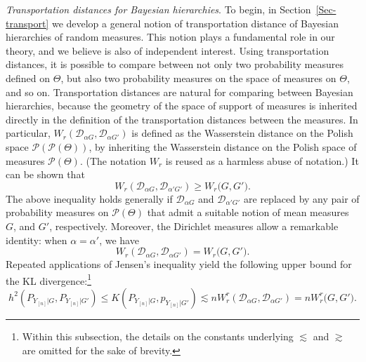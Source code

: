 \documentclass[MSNbibl,number,citesort]{arxbj}
\newcommand{\Pcal}{\mathscr{P}}
\newcommand{\DP}{\mathscr{D}}
\newcommand{\Wr}{W_r}
\newcommand{\PG}{P_{Y_{[n]}|G}}
\begin{document}
\textit{Transportation distances for Bayesian hierarchies}.
To begin, in Section~\ref{Sec-transport} we
develop a general notion of transportation distance of
Bayesian hierarchies of random measures. This notion plays a
fundamental role in our theory, and we believe is also of
independent interest. Using transportation distances,
it is possible to compare between not only
two probability measures defined on $\Theta$,
but also two probability measures on the
space of measures on $\Theta$, and so on. Transportation
distances are natural for comparing between Bayesian hierarchies,
because the geometry of the space of support of measures is
inherited directly in the definition of the transportation distances
between the measures. In particular, $\Wr(\DP_{\alpha G},
\DP_{\alpha G'})$ is defined as the Wasserstein distance on the Polish
space $\Pcal(\Pcal(\Theta))$, by inheriting the Wasserstein
distance on the Polish space of measures $\Pcal(\Theta)$. (The
notation $\Wr$ is reused as a harmless abuse of notation.) It
can be shown that %
%
\[
\Wr(\DP_{\alpha G},\DP_{\alpha' G'}) \geq\Wr \bigl(G,G'
\bigr).
\]
%
The above inequality holds generally if $\DP_{\alpha G}$ and $\DP
_{\alpha' G'}$ are
replaced by any pair of probability measures on $\Pcal(\Theta)$ that
admit a suitable notion of mean measures $G$, and $G'$, respectively.
Moreover, the Dirichlet measures allow a remarkable identity:
when $\alpha= \alpha'$, we have
%
\[
\Wr(\DP_{\alpha G},\DP_{\alpha G'}) = \Wr \bigl(G,G'
\bigr).
\]
%
Repeated applications of Jensen's inequality yield
the following upper bound for the KL divergence:\footnote{Within
this subsection, the details on the constants
underlying $\lesssim$ and $\gtrsim$ are omitted for the
sake of brevity.}
%
\[
h^2(\PG,P_{Y_{[n]}|G'}) \leq K(\PG,{p_{Y_{[n]}|G'}})
\lesssim n \Wr^r(\DP_{\alpha G},\DP_{\alpha G'}) = n
\Wr^r \bigl(G,G' \bigr).
\]
%
\end{document}
